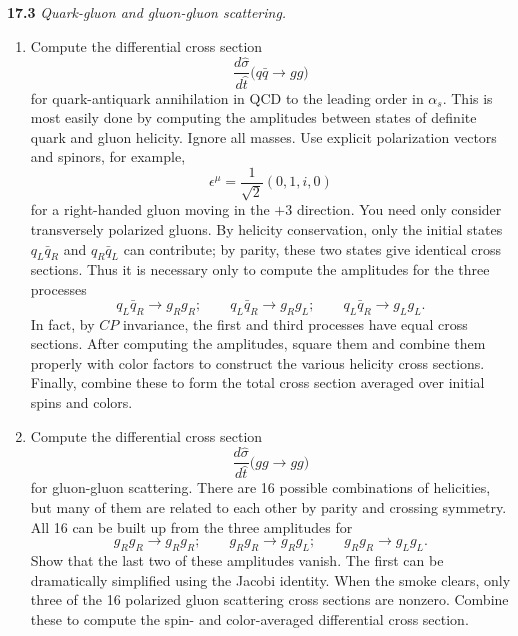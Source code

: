 \textbf{17.3} \emph{Quark-gluon and gluon-gluon scattering.}
\begin{enumerate}[label=(\alph*)]
  \item Compute the differential cross section
    \begin{equation}
      \frac{d\hat{\sigma}}{d\hat{t}}\bigl( q\bar{q} \to gg \bigr)
    \end{equation}
    for quark-antiquark annihilation in QCD to the leading order in
    $\alpha_s$.  This is most easily done by computing the amplitudes between
    states of definite quark and gluon helicity.  Ignore all masses.  Use
    explicit polarization vectors and spinors, for example,
    \begin{equation}
      \epsilon^\mu = \frac{1}{\sqrt{2}}(0, 1, i, 0)
    \end{equation}
    for a right-handed gluon moving in the $+3$ direction.  You need only
    consider transversely polarized gluons.  By helicity conservation, only
    the initial states $q_L\bar{q}_R$ and $q_R\bar{q}_L$ can contribute; by
    parity, these two states give identical cross sections.  Thus it is
    necessary only to compute the amplitudes for the three processes
    \begin{equation}
      q_L\bar{q}_R \to g_Rg_R;\qquad
      q_L\bar{q}_R \to g_Rg_L;\qquad
      q_L\bar{q}_R \to g_Lg_L .
    \end{equation}
    In fact, by $CP$ invariance, the first and third processes have equal
    cross sections.  After computing the amplitudes, square them and combine
    them properly with color factors to construct the various helicity cross
    sections.  Finally, combine these to form the total cross section
    averaged over initial spins and colors.
  \item Compute the differential cross section
    \begin{equation}
      \frac{d\hat{\sigma}}{d\hat{t}}\bigl( gg \to gg \bigr)
    \end{equation}
    for gluon-gluon scattering.  There are 16 possible combinations of
    helicities, but many of them are related to each other by parity and
    crossing symmetry.  All 16 can be built up from the three amplitudes for
    \begin{equation}
      g_Rg_R \to g_Rg_R;\qquad
      g_Rg_R \to g_Rg_L;\qquad
      g_Rg_R \to g_Lg_L .
    \end{equation}
    Show that the last two of these amplitudes vanish.  The first can be
    dramatically simplified using the Jacobi identity.  When the smoke
    clears, only three of the 16 polarized gluon scattering cross sections
    are nonzero.  Combine these to compute the spin- and color-averaged
    differential cross section.
\end{enumerate}

